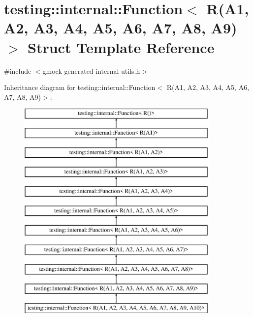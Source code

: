 \hypertarget{structtesting_1_1internal_1_1_function_3_01_r_07_a1_00_01_a2_00_01_a3_00_01_a4_00_01_a5_00_01_a6dfab3ccde80824a59fc4efd5336a27c1}{}\section{testing\+::internal\+::Function$<$ R(A1, A2, A3, A4, A5, A6, A7, A8, A9)$>$ Struct Template Reference}
\label{structtesting_1_1internal_1_1_function_3_01_r_07_a1_00_01_a2_00_01_a3_00_01_a4_00_01_a5_00_01_a6dfab3ccde80824a59fc4efd5336a27c1}


{\ttfamily \#include $<$gmock-\/generated-\/internal-\/utils.\+h$>$}

Inheritance diagram for testing\+::internal\+::Function$<$ R(A1, A2, A3, A4, A5, A6, A7, A8, A9)$>$\+:\begin{figure}[H]
\begin{center}
\leavevmode
\includegraphics[height=11.000000cm]{d1/dd1/structtesting_1_1internal_1_1_function_3_01_r_07_a1_00_01_a2_00_01_a3_00_01_a4_00_01_a5_00_01_a6dfab3ccde80824a59fc4efd5336a27c1}
\end{center}
\end{figure}
